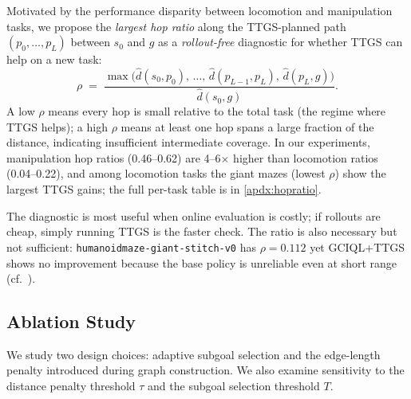 \documentclass{article} %
\begin{document}
Motivated by the performance disparity between locomotion and manipulation tasks, we propose the \emph{largest hop ratio} along the TTGS-planned path $(p_0, \dots, p_L)$ between $s_0$ and $g$ as a \emph{rollout-free} diagnostic for whether TTGS can help on a new task:
\[
    \rho \;=\; \frac{\max\bigl(\hat d(s_0, p_0),\, \ldots,\, \hat d(p_{L-1}, p_L),\, \hat d(p_L, g)\bigr)}{\hat d(s_0, g)}.
\]
A low $\rho$ means every hop is small relative to the total task (the regime where TTGS helps); a high $\rho$ means at least one hop spans a large fraction of the distance, indicating insufficient intermediate coverage. In our experiments, manipulation hop ratios (0.46--0.62) are 4--6$\times$ higher than locomotion ratios (0.04--0.22), and among locomotion tasks the giant mazes (lowest $\rho$) show the largest TTGS gains; the full per-task table is in \autoref{apdx:hopratio}.

The diagnostic is most useful when online evaluation is costly; if rollouts are cheap, simply running TTGS is the faster check. The ratio is also necessary but not sufficient: \texttt{humanoidmaze-giant-stitch-v0} has $\rho{=}0.112$ yet GCIQL+TTGS shows no improvement because the base policy is unreliable even at short range (cf.\ ).


\subsection{Ablation Study}

We study two design choices: adaptive subgoal selection and the edge-length penalty introduced during graph construction. We also examine sensitivity to the distance penalty threshold $\tau$ and the subgoal selection threshold $T$.
\end{document}
